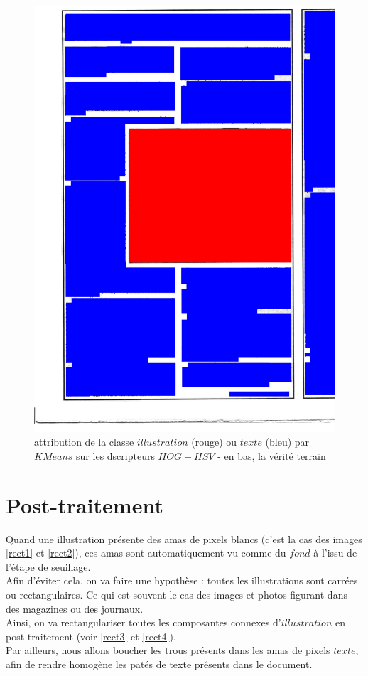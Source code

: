 \documentclass{book}
\begin{document}
\begin{figure}[H]
\begin{center}
\includegraphics[scale=0.3]{images/1g_m.jpg}
\end{center}
\caption{attribution de la classe $illustration$ (rouge) ou $texte$ (bleu) par $KMeans$ sur les dscripteurs $HOG+HSV$ - en bas, la vérité terrain}
\label{resultat}
\end{figure}

\chapter{Post-traitement}

Quand une illustration présente des amas de pixels blancs (c'est la cas des images \ref{rect1} et \ref{rect2}), ces amas sont automatiquement vu comme du $fond$ à l'issu de l'étape
de seuillage.\\
Afin d'éviter cela, on va faire une hypothèse : toutes les illustrations sont carrées ou rectangulaires. Ce qui est souvent le cas des images et photos
figurant dans des magazines ou des journaux.\\
Ainsi, on va \og rectangulariser \fg{} toutes les composantes connexes d'$illustration$ en post-traitement (voir \ref{rect3} et \ref{rect4}).\\
Par ailleurs, nous allons \og boucher \fg{} les trous présents dans les amas de pixels $texte$, afin de rendre homogène les patés de texte 
présents dans le document.\\
\end{document}
